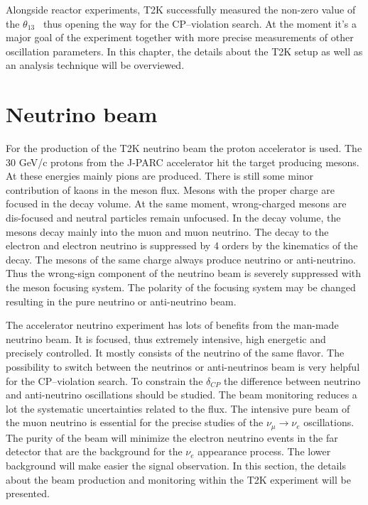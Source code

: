 \documentclass[../main.tex]{subfiles}
\begin{document}
Alongside reactor experiments, T2K successfully measured the non-zero value of the $\theta_{13}$~\cite{Abe2014} thus opening the way for the CP--violation search. At the moment it's a major goal of the experiment together with more precise measurements of other oscillation parameters. In this chapter, the details about the T2K setup as well as an analysis technique will be overviewed.

\section{Neutrino beam}
\label{ch:T2K:nu_beam}

For the production of the T2K neutrino beam the proton accelerator is used. The 30 GeV/c protons from the J-PARC accelerator hit the target producing mesons. At these energies mainly pions are produced. There is still some minor contribution of kaons in the meson flux. Mesons with the proper charge are focused in the decay volume. At the same moment, wrong-charged mesons are dis-focused and neutral particles remain unfocused. In the decay volume, the mesons decay mainly into the muon and muon neutrino. The decay to the electron and electron neutrino is suppressed by 4 orders by the kinematics of the decay. The mesons of the same charge always produce neutrino or anti-neutrino. Thus the wrong-sign component of the neutrino beam is severely suppressed with the meson focusing system. The polarity of the focusing system may be changed resulting in the pure neutrino or anti-neutrino beam.

The accelerator neutrino experiment has lots of benefits from the man-made neutrino beam. It is focused, thus extremely intensive, high energetic and precisely controlled. It mostly consists of the neutrino of the same flavor. The possibility to switch between the neutrinos or anti-neutrinos beam is very helpful for the CP--violation search. To constrain the $\delta_{CP}$ the difference between neutrino and anti-neutrino oscillations should be studied. The beam monitoring reduces a lot the systematic uncertainties related to the flux. The intensive pure beam of the muon neutrino is essential for the precise studies of the $\nu_\mu\to\nu_e$ oscillations. The purity of the beam will minimize the electron neutrino events in the far detector that are the background for the $\nu_e$ appearance process. The lower background will make easier the signal observation. In this section, the details about the beam production and monitoring within the T2K experiment will be presented.
\end{document}
